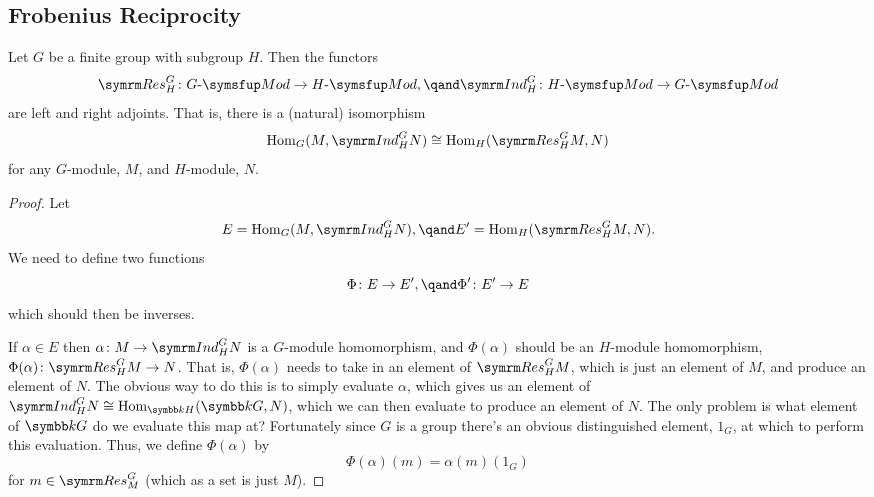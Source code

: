 \subsection{Frobenius Reciprocity}
\begin{thm}{}{}
    Let \(G\) be a finite group with subgroup \(H\).
    Then the functors
    \begin{equation}
        \Res^G_H \colon \Mod{G} \to \Mod{H}, \qand \Ind^G_H \colon \Mod{H} \to \Mod{G}
    \end{equation}
    are left and right adjoints.
    That is, there is a (natural) isomorphism
    \begin{equation}
        \Hom_G(M, \Ind^G_H N) \isomorphic \Hom_H(\Res^G_H M, N)
    \end{equation}
    for any \(G\)-module, \(M\), and \(H\)-module, \(N\).
    \begin{proof}
        Let
        \begin{equation}
            E = \Hom_G(M, \Ind^G_H N), \qand E' = \Hom_H(\Res^G_H M, N).
        \end{equation}
        We need to define two functions
        \begin{equation}
            \Phi \colon E \to E', \qand \Phi' \colon E' \to E
        \end{equation}
        which should then be inverses.
        
        If \(\alpha \in E\) then \(\alpha \colon M \to \Ind^G_H N\) is a \(G\)-module homomorphism, and \(\Phi(\alpha)\) should be an \(H\)-module homomorphism, \(\Phi(\alpha) \colon \Res^G_H M \to N\).
        That is, \(\Phi(\alpha)\) needs to take in an element of \(\Res^G_H M\), which is just an element of \(M\), and produce an element of \(N\).
        The obvious way to do this is to simply evaluate \(\alpha\), which gives us an element of \(\Ind^G_H N \isomorphic \Hom_{\field H}(\field G, N)\), which we can then evaluate to produce an element of \(N\).
        The only problem is what element of \(\field G\) do we evaluate this map at?
        Fortunately since \(G\) is a group there's an obvious distinguished element, \(1_G\), at which to perform this evaluation.
        Thus, we define \(\Phi(\alpha)\) by
        \begin{equation}
            \Phi(\alpha)(m) = \alpha(m)(1_G)
        \end{equation}
        for \(m \in \Res^G_M\) (which as a set is just \(M\)).
        

\end{proof}
\end{thm}
